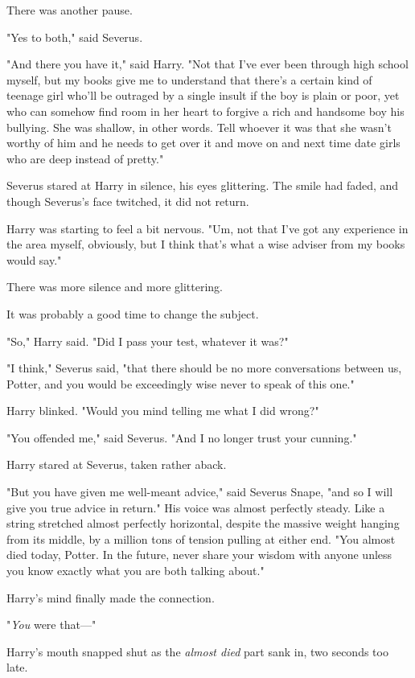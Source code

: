 There was another pause.

"Yes to both," said Severus.

"And there you have it," said Harry. "Not that I've ever been through high
school myself, but my books give me to understand that there's a certain kind
of teenage girl who'll be outraged by a single insult if the boy is plain or
poor, yet who can somehow find room in her heart to forgive a rich and handsome
boy his bullying. She was shallow, in other words. Tell whoever it was that she
wasn't worthy of him and he needs to get over it and move on and next time date
girls who are deep instead of pretty."

Severus stared at Harry in silence, his eyes glittering. The smile had faded,
and though Severus's face twitched, it did not return.

Harry was starting to feel a bit nervous. "Um, not that I've got any experience
in the area myself, obviously, but I think that's what a wise adviser from my
books would say."

There was more silence and more glittering.

It was probably a good time to change the subject.

"So," Harry said. "Did I pass your test, whatever it was?"

"I think," Severus said, "that there should be no more conversations between
us, Potter, and you would be exceedingly wise never to speak of this one."

Harry blinked. "Would you mind telling me what I did wrong?"

"You offended me," said Severus. "And I no longer trust your cunning."

Harry stared at Severus, taken rather aback.

"But you have given me well-meant advice," said Severus Snape, "and so I will
give you true advice in return." His voice was almost perfectly steady. Like a
string stretched almost perfectly horizontal, despite the massive weight
hanging from its middle, by a million tons of tension pulling at either end.
"You almost died today, Potter. In the future, never share your wisdom with
anyone unless you know exactly what you are both talking about."

Harry's mind finally made the connection.

"\emph{You} were that\mbox{---}"

Harry's mouth snapped shut as the \emph{almost died} part sank in, two seconds
too late.

